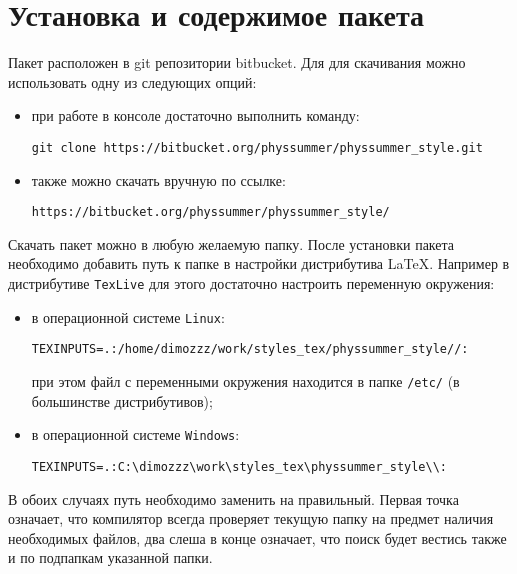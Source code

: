 \section{Установка и содержимое пакета}

Пакет расположен в git репозитории bitbucket. Для для скачивания можно использовать одну из следующих
опций:
\begin{itemize}
    \item при работе в консоле достаточно выполнить команду:
        \begin{lstlisting}[gobble = 7, keepspaces = \false]
            git clone https://bitbucket.org/physsummer/physsummer_style.git
        \end{lstlisting}
    \item также можно скачать вручную по ссылке:
        \begin{lstlisting}[gobble = 7, keepspaces = \false]
            https://bitbucket.org/physsummer/physsummer_style/
        \end{lstlisting}
\end{itemize}


Скачать пакет можно в любую желаемую папку. После установки пакета необходимо добавить путь к папке в
настройки дистрибутива \LaTeX. Например в дистрибутиве \texttt{TexLive} для этого достаточно настроить
переменную окружения:

\begin{itemize}
    \item в операционной системе \texttt{Linux}:
        \begin{lstlisting}[gobble = 7, keepspaces = \false]
            TEXINPUTS=.:/home/dimozzz/work/styles_tex/physsummer_style//:
        \end{lstlisting}
        при этом файл с переменными окружения находится в папке \texttt{/etc/} (в большинстве дистрибутивов);
    \item в операционной системе \texttt{Windows}:
        \begin{lstlisting}[gobble = 7, keepspaces = \false]
            TEXINPUTS=.:C:\dimozzz\work\styles_tex\physsummer_style\\:
        \end{lstlisting}
\end{itemize}

В обоих случаях путь необходимо заменить на правильный. Первая точка означает, что компилятор всегда
проверяет текущую папку на предмет наличия необходимых файлов, два слеша в конце означает, что поиск
будет вестись также и по подпапкам указанной папки.